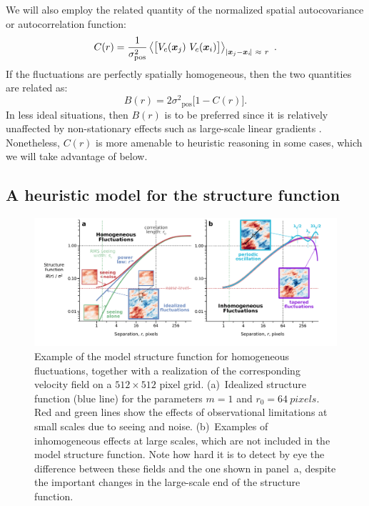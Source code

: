 \documentclass[fleqn,usenatbib, useAMS, a4paper]{mnras}
\newcommand\pos{\ensuremath{_{\mathrm{pos}}}}
\begin{document}
We will also employ the related quantity of the
normalized spatial autocovariance or autocorrelation function:
\begin{equation}
  \label{eq:autocovar}
  C(r) = \frac{1}{\sigma^2\pos}\left\langle 
  \bigl[
  V_{c}(\xx_j) \  V_{c}(\xx_i)
  \bigr] \right \rangle_{\Abs{\xx_j - \xx_i\!} \ \approx \ r} \ .
\end{equation}
If the fluctuations are perfectly spatially homogeneous, then the
two quantities are related \citep{1984ApJ...277..556S} as:
\begin{equation}\label{eq:functional}
  B(r) = 2\sigma^2\pos \bigl[   1 - C(r)\bigr] .
\end{equation}
In less ideal situations, then \(B(r)\) is to be preferred since it is
relatively unaffected by non-stationary effects
such as large-scale linear gradients 
\citep{1984ApJ...277..556S}.
Nonetheless, \(C(r)\) is more amenable to heuristic reasoning in some cases,
which we will take advantage of below.


\subsection{A heuristic model for the structure function}
\label{sec:methods-apply}

\begin{figure}
 \centering
 \includegraphics[width=\linewidth]{Figures/model-strucfunc-annotated}\par
 \caption{
   Example of the model structure function for homogeneous fluctuations,
   together with a realization of the corresponding velocity field
   on a \(512 \times 512\) pixel grid.  
   (a)~Idealized structure function (blue line)
   for the parameters \(m = 1\) and \(r_0 = \SI{64}{pixels}\).
   Red and green lines show the effects of observational limitations
   at small scales due to seeing and noise.
   (b)~Examples of inhomogeneous effects at large scales,
   which are not included in the model structure function.
   Note how hard it is to detect by eye the difference between these
   fields and the one shown in panel~a, despite the important changes
   in the large-scale end of the structure function.
 }
 \label{fig:model-strucfunc}
\end{figure}
\end{document}
